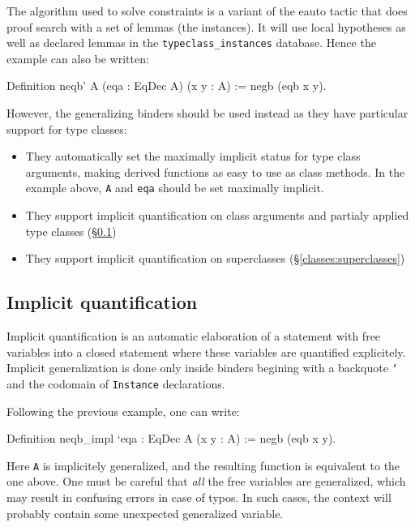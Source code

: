 The algorithm used to solve constraints is a variant of the eauto tactic
that does proof search with a set of lemmas (the instances). It will use
local hypotheses as well as declared lemmas in the
\texttt{typeclass\_instances} database. Hence the example can also be
written:

\begin{coq_example}
Definition neqb' A (eqa : EqDec A) (x y : A) := negb (eqb x y).
\end{coq_example}

However, the generalizing binders should be used instead as they have
particular support for type classes:
\begin{itemize}
\item They automatically set the maximally implicit status for type
  class arguments, making derived functions as easy to use as class
  methods. In the example above, \texttt{A} and \texttt{eqa} should be
  set maximally implicit.
\item They support implicit quantification on class arguments and
  partialy applied type classes (\S \ref{classes:impl-quant})
\item They support implicit quantification on superclasses (\S \ref{classes:superclasses})
\end{itemize}

\subsection{Implicit quantification}
\label{classes:impl-quant}

Implicit quantification is an automatic elaboration of a statement with
free variables into a closed statement where these variables are
quantified explicitely. Implicit generalization is done only inside
binders begining with a backquote \texttt{`} and the codomain of
\texttt{Instance} declarations.

Following the previous example, one can write:
\begin{coq_example}
Definition neqb_impl `{eqa : EqDec A} (x y : A) := negb (eqb x y).
\end{coq_example}

Here \texttt{A} is implicitely generalized, and the resulting function
is equivalent to the one above. One must be careful that \emph{all} the
free variables are generalized, which may result in confusing errors in
case of typos. In such cases, the context will probably contain some
unexpected generalized variable.

